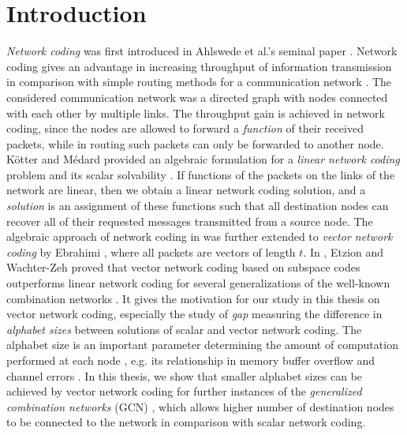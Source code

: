 \chapter{Introduction} \label{chap:introduction}

\textit{Network coding} was first introduced in Ahlswede et al.'s
seminal paper \cite{Ahlswede:2000}. Network coding gives an advantage
in increasing throughput of information transmission in comparison
with simple routing methods for a communication network \cite{Li:2003,Ho:2003}.
The considered communication network was a directed graph with nodes
connected with each other by multiple links. The throughput gain is
achieved in network coding, since the nodes are allowed to forward
a \textit{function} of their received packets, while in routing such
packets can only be forwarded to another node. K\"otter and M\'edard
provided an algebraic formulation for a \textit{linear network coding}
problem and its scalar solvability \cite{Koetter:2003}. If functions
of the packets on the links of the network are linear, then we obtain
a linear network coding solution, and a \textit{solution} is an assignment
of these functions such that all destination nodes can recover all
of their requested messages transmitted from a source node. The algebraic
approach of network coding in \cite{Koetter:2003} was further extended
to \textit{vector network coding} by Ebrahimi \cite{Ebrahimi:2011},
where all packets are vectors of length $t$. In \cite{Wachter-Zeh:2018},
Etzion and Wachter-Zeh proved that vector network coding based on
subspace codes outperforms linear network coding for several generalizations
of the well-known combination networks \cite{Riis:2006}. It gives
the motivation for our study in this thesis on vector network coding,
especially the study of \textit{gap} measuring the difference in \textit{alphabet
sizes} between solutions of scalar and vector network coding. The
alphabet size is an important parameter determining the amount of
computation performed at each node \cite{Wachter-Zeh:2018}, e.g.
its relationship in memory buffer overflow and channel errors \cite{Ho:2008,Fragouli:2006,Gone:2018}.
In this thesis, we show that smaller alphabet sizes can be achieved
by vector network coding for further instances of the \textit{generalized
combination networks} (GCN) \cite{Wachter-Zeh:2018}, which allows
higher number of destination nodes to be connected to the network
in comparison with scalar network coding.

